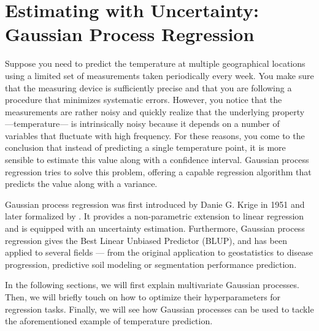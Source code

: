 
\section{Estimating with Uncertainty: Gaussian Process Regression}\label{sec:gaussian_process_background}
Suppose you need to predict the temperature at multiple geographical locations using a limited set of measurements taken periodically every week. You make sure that the measuring device is sufficiently precise and that you are following a procedure that minimizes systematic errors. However, you notice that the measurements are rather noisy and quickly realize that the underlying property ---temperature--- is intrinsically noisy because it depends on a number of variables that fluctuate with high frequency. For these reasons, you come to the conclusion that instead of predicting a single temperature point, it is more sensible to estimate this value along with a confidence interval. Gaussian process regression tries to solve this problem, offering a capable regression algorithm that predicts the value along with a variance.

Gaussian process regression was first introduced by Danie G. Krige in 1951 and later formalized by . It provides a non-parametric extension to linear regression and is equipped with an uncertainty estimation. Furthermore, Gaussian process regression gives the Best Linear Unbiased Predictor (BLUP), and has been applied to several fields --- from the original application to geostatistics to disease progression, predictive soil modeling or segmentation performance prediction.

In the following sections, we will first explain multivariate Gaussian processes. Then, we will briefly touch on how to optimize their hyperparameters for regression tasks. Finally, we will see how Gaussian processes can be used to tackle the aforementioned example of temperature prediction.



